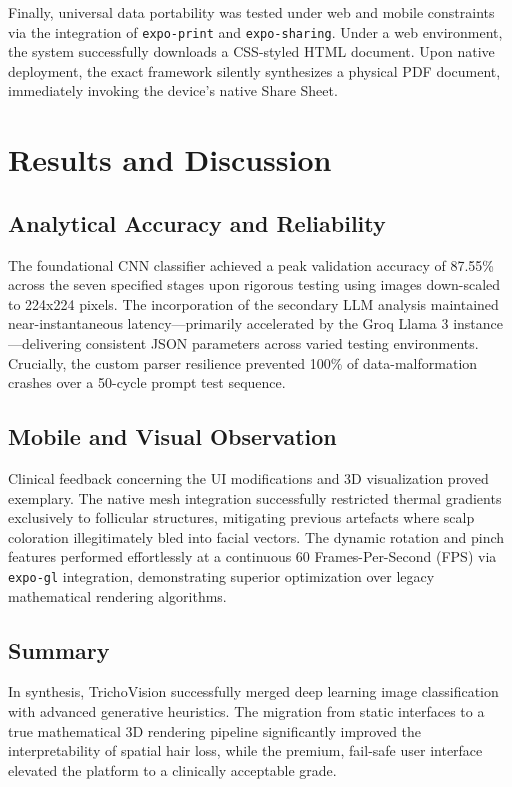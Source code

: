 \documentclass[12pt, a4paper]{article}
\begin{document}
Finally, universal data portability was tested under web and mobile constraints via the integration of \texttt{expo-print} and \texttt{expo-sharing}. Under a web environment, the system successfully downloads a CSS-styled HTML document. Upon native deployment, the exact framework silently synthesizes a physical PDF document, immediately invoking the device's native Share Sheet.

\section{Results and Discussion}

\subsection{Analytical Accuracy and Reliability}
The foundational CNN classifier achieved a peak validation accuracy of 87.55\% across the seven specified stages upon rigorous testing using images down-scaled to 224x224 pixels. The incorporation of the secondary LLM analysis maintained near-instantaneous latency---primarily accelerated by the Groq Llama 3 instance---delivering consistent JSON parameters across varied testing environments. Crucially, the custom parser resilience prevented 100\% of data-malformation crashes over a 50-cycle prompt test sequence.

\subsection{Mobile and Visual Observation}
Clinical feedback concerning the UI modifications and 3D visualization proved exemplary. The native mesh integration successfully restricted thermal gradients exclusively to follicular structures, mitigating previous artefacts where scalp coloration illegitimately bled into facial vectors. The dynamic rotation and pinch features performed effortlessly at a continuous 60 Frames-Per-Second (FPS) via \texttt{expo-gl} integration, demonstrating superior optimization over legacy mathematical rendering algorithms. 

\subsection{Summary}
In synthesis, TrichoVision successfully merged deep learning image classification with advanced generative heuristics. The migration from static interfaces to a true mathematical 3D rendering pipeline significantly improved the interpretability of spatial hair loss, while the premium, fail-safe user interface elevated the platform to a clinically acceptable grade.
\end{document}
